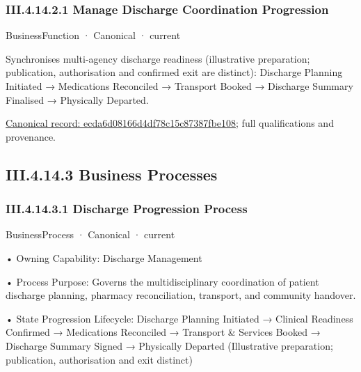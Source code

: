 \subsubsection*{III.4.14.2.1 Manage Discharge Coordination Progression}
\label{navigation:III.4.14.2.1}

\label{element:ecda6d08166d4df78c15c87387fbe108}
{\small BusinessFunction · Canonical · current}\par

Synchronises multi-agency discharge readiness (illustrative preparation; publication, authorisation and confirmed exit are distinct): Discharge Planning Initiated → Medications Reconciled → Transport Booked → Discharge Summary Finalised → Physically Departed.


{\footnotesize \href{../../../../continuum/business/business-function/ecda6d08166d4df78c15c87387fbe108.md}{Canonical record: ecda6d08166d4df78c15c87387fbe108}; full qualifications and provenance.}\par
\subsection*{III.4.14.3 Business Processes}
\label{navigation:III.4.14.3}

\subsubsection*{III.4.14.3.1 Discharge Progression Process}
\label{navigation:III.4.14.3.1}

\label{element:7165955d9c454175a04b9ad00293f011}
{\small BusinessProcess · Canonical · current}\par

•
Owning Capability: Discharge Management



•
Process Purpose: Governs the multidisciplinary coordination of patient discharge planning, pharmacy reconciliation, transport, and community handover.



•
State Progression Lifecycle: Discharge Planning Initiated → Clinical Readiness Confirmed → Medications Reconciled → Transport \& Services Booked → Discharge Summary Signed → Physically Departed   (Illustrative preparation; publication, authorisation and exit distinct)



